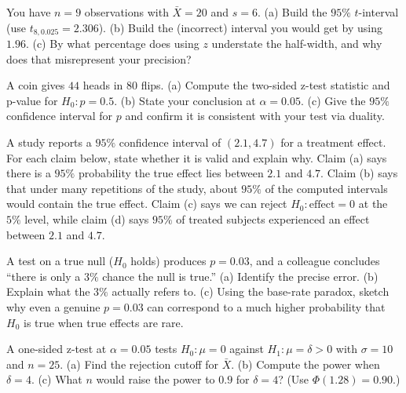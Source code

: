 \begin{exercise}[z versus t]
You have $n=9$ observations with $\bar X = 20$ and $s = 6$. (a) Build the $95\%$
$t$-interval (use $t_{8,0.025}=2.306$). (b) Build the (incorrect) interval you would get
by using $1.96$. (c) By what percentage does using $z$ understate the half-width, and
why does that misrepresent your precision?
\end{exercise}

\begin{exercise}
A coin gives $44$ heads in $80$ flips. (a) Compute the two-sided z-test statistic and
p-value for $H_0\!: p=0.5$. (b) State your conclusion at $\alpha=0.05$. (c) Give the
$95\%$ confidence interval for $p$ and confirm it is consistent with your test via
duality.
\end{exercise}

\begin{exercise}
A study reports a $95\%$ confidence interval of $(2.1, 4.7)$ for a treatment effect. For
each claim below, state whether it is valid and explain why. Claim (a) says there is a
$95\%$ probability the true effect lies between $2.1$ and $4.7$. Claim (b) says that under
many repetitions of the study, about $95\%$ of the computed intervals would contain the true
effect. Claim (c) says we can reject $H_0\!:\text{effect}=0$ at the $5\%$ level, while claim
(d) says $95\%$ of treated subjects experienced an effect between $2.1$ and $4.7$.
\end{exercise}

\begin{exercise}
A test on a true null ($H_0$ holds) produces $p=0.03$, and a colleague concludes ``there
is only a $3\%$ chance the null is true.'' (a) Identify the precise error. (b) Explain
what the $3\%$ actually refers to. (c) Using the base-rate paradox, sketch why even a
genuine $p=0.03$ can correspond to a much higher probability that $H_0$ is true when
true effects are rare.
\end{exercise}

\begin{exercise}[Power]
A one-sided z-test at $\alpha=0.05$ tests $H_0\!:\mu=0$ against $H_1\!:\mu=\delta>0$ with
$\sigma=10$ and $n=25$. (a) Find the rejection cutoff for $\bar X$. (b) Compute the power
when $\delta=4$. (c) What $n$ would raise the power to $0.9$ for $\delta=4$? (Use
$\Phi(1.28)=0.90$.)
\end{exercise}

